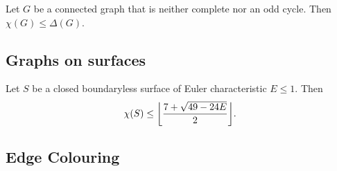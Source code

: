 \documentclass{article}
\DeclarePairedDelimiter\floor{\lfloor}{\rfloor}
\begin{document}
{
}


{
}















\begin{nthm}\label{thm:28}
    Let $G$ be a connected graph that is neither complete nor an odd cycle.
    Then $\chi(G) \leq \Delta(G)$.
\end{nthm}

\subsection{Graphs on surfaces}






















\begin{nthm}\label{thm:29}
    Let $S$ be a closed boundaryless surface of Euler characteristic $E \leq 1$. Then
    \begin{equation*}
        \chi(S) \leq \floor*{\frac{7 + \sqrt{49-24E}}{2}}.
    \end{equation*}
\end{nthm}





























\subsection{Edge Colouring}
\end{document}
